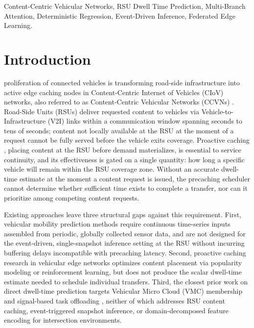 \documentclass[journal]{IEEEtran}
\begin{document}
\begin{IEEEkeywords}
Content-Centric Vehicular Networks, RSU Dwell Time Prediction, Multi-Branch Attention, Deterministic Regression, Event-Driven Inference, Federated Edge Learning.
\end{IEEEkeywords}

\IEEEpeerreviewmaketitle


\section{Introduction} \label{sec:introduction}

 proliferation of connected vehicles is transforming road-side infrastructure into active edge caching nodes in Content-Centric Internet of Vehicles (CIoV) networks, also referred to as Content-Centric Vehicular Networks (CCVNs) \cite{Mao2017, Ji2020IoV}.
Road-Side Units (RSUs) deliver requested content to vehicles via Vehicle-to-Infrastructure (V2I) links within a communication window spanning seconds to tens of seconds; content not locally available at the RSU at the moment of a request cannot be fully served before the vehicle exits coverage.
Proactive caching \cite{Bui2017}, placing content at the RSU before demand materializes, is essential to service continuity, and its effectiveness is gated on a single quantity: how long a specific vehicle will remain within the RSU coverage zone.
Without an accurate dwell-time estimate at the moment a content request is issued, the precaching scheduler cannot determine whether sufficient time exists to complete a transfer, nor can it prioritize among competing content requests.

Existing approaches leave three structural gaps against this requirement.
First, vehicular mobility prediction methods \cite{Altche2017, Deo2018, Yu2018STGCN, Guo2019ASTGCN} require continuous time-series inputs assembled from periodic, globally collected sensor data, and are not designed for the event-driven, single-snapshot inference setting at the RSU without incurring buffering delays incompatible with precaching latency.
Second, proactive caching research in vehicular edge networks \cite{Wang2020IoT, Wang2023Async, WangGrace2023, Jiang2024, Wang2025Informer, Khelifi2018, He2020DRL} optimizes content placement via popularity modeling or reinforcement learning, but does not produce the scalar dwell-time estimate needed to schedule individual transfers.
Third, the closest prior work on direct dwell-time prediction targets Vehicular Micro Cloud (VMC) membership \cite{VMCdwell2023} and signal-based task offloading \cite{TaskMig2023}, neither of which addresses RSU content caching, event-triggered snapshot inference, or domain-decomposed feature encoding for intersection environments.
\end{document}
